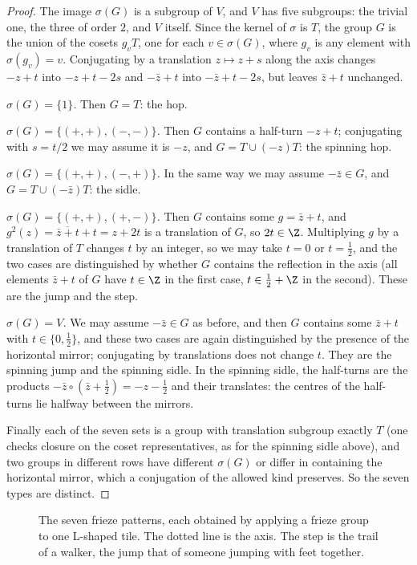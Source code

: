 \begin{proof}
The image $\sigma(G)$ is a subgroup of $V$, and $V$ has five subgroups: the trivial one, the three of order $2$, and $V$ itself. Since the
kernel of $\sigma$ is $T$, the group $G$ is the union of the cosets $g_vT$, one for each $v\in\sigma(G)$, where $g_v$ is any element with
$\sigma(g_v)=v$. Conjugating by a translation $z\mapsto z+s$ along the axis changes $-z+t$ into $-z+t-2s$ and $-\bar z+t$ into
$-\bar z+t-2s$, but leaves $\bar z+t$ unchanged.

\emph{$\sigma(G)=\{1\}$.} Then $G=T$: the hop.

\emph{$\sigma(G)=\{(+,+),(-,-)\}$.} Then $G$ contains a half-turn $-z+t$; conjugating with $s=t/2$ we may assume it is $-z$, and
$G=T\cup(-z)T$: the spinning hop.

\emph{$\sigma(G)=\{(+,+),(-,+)\}$.} In the same way we may assume $-\bar z\in G$, and $G=T\cup(-\bar z)T$: the sidle.

\emph{$\sigma(G)=\{(+,+),(+,-)\}$.} Then $G$ contains some $g=\bar z+t$, and $g^2(z)=\overline{\bar z+t}+t=z+2t$ is a translation of $G$, so
$2t\in\Z$. Multiplying $g$ by a translation of $T$ changes $t$ by an integer, so we may take $t=0$ or $t=\frac12$, and the two cases
are distinguished by whether $G$ contains the reflection in the axis (all elements $\bar z+t$ of $G$ have $t\in\Z$ in the first case,
$t\in\frac12+\Z$ in the second). These are the jump and the step.

\emph{$\sigma(G)=V$.} We may assume $-\bar z\in G$ as before, and then $G$ contains some $\bar z+t$ with $t\in\{0,\frac12\}$, and these two
cases are again distinguished by the presence of the horizontal mirror; conjugating by translations does not change $t$. They are the
spinning jump and the spinning sidle. In the spinning sidle, the half-turns are the products $-\bar z\circ(\bar z+\frac12)=-z-\frac12$
and their translates: the centres of the half-turns lie halfway between the mirrors.

Finally each of the seven sets is a group with translation subgroup exactly $T$ (one checks closure on the coset representatives,
as for the spinning sidle above), and two groups in different rows have different $\sigma(G)$ or differ in containing the horizontal
mirror, which a conjugation of the allowed kind preserves. So the seven types are distinct.
\end{proof}

\begin{figure}[ht]
\centering
{}
\caption{The seven frieze patterns, each obtained by applying a frieze group to one L-shaped tile. The dotted line is the axis. The
step is the trail of a walker, the jump that of someone jumping with feet together.}
\label{geometry:fig:friezes}
\end{figure}

